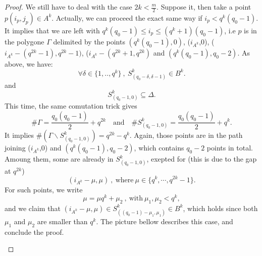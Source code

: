 \documentclass[a4paper]{article}
\begin{document}
\begin{proof}
We still have to deal with the case $2k < \frac{m}{2}$. Suppose it, then take a point $p(i_p,j_p) \in A^k$. Actually, we can proceed the exact same way if $i_p < q^k(q_0-1)$. It implies that we are left with $q^k(q_0-1) \leq i_p \leq (q^k+1)(q_0-1)$, i.e $p$ is in the polygone $\Gamma$ delimited by the points $(q^k(q_0-1),0)$, ($i_{A^k}$,0), ($i_{A^k}-(q^{2k}-1),q^{2k}-1)$, ($i_{A^k}-(q^{2k}+1,q^{2k})$ and $(q^k(q_0-1),q_0-2)$. As above, we have:
 \[ \forall \delta \in \{1,..,q^k\} \ , \ S^k_{(q_0-\delta,\delta-1)} \in B^k.\]
 and 
 \[S^k_{(q_0-1,0)} \subseteq \Delta.\]
This time, the same comutation trick gives
\[ \# \Gamma = \dfrac{q_0(q_0-1)}{2}+q^{2k} \quad \mathrm{and} \quad \# S^k_{(q_0-1,0)} = \dfrac{q_0(q_0-1)}{2}+q^{k}.\]
It implies $\# (\Gamma \backslash  S^k_{(q_0-1,0)}) = q^{2k}-q^k$. Again, those points are in the path joining ($i_{A^k}$,0) and  $(q^k(q_0-1),q_0-2)$, which contains $q_0-2$ points in total. Amoung them, some are already in $S^k_{(q_0-1,0)}$, exepted for (this is due to the gap at $q^{2k}$) 
\[ (i_{A^k}-\mu,\mu) \ , \ \mathrm{where} \ \mu \in \{q^k,\cdots,q^{2k}-1\}.\]
For such points, we write
\[\mu = \mu q^k + \mu_2 \ , \ \mathrm{with} \ \mu_1,\mu_2 < q^k,\]
and we claim that $(i_{A^k}-\mu,\mu) \in S^k_{((q_0-1)-\mu_1,\mu_1)} \in B^k$, which holds since both $\mu_1$ and $\mu_2$ are smaller than $q^k$. The picture bellow describes this case, and conclude the proof.

\begin{figure}[h]
\begin{center}
\end{center}
\end{figure}
\end{proof}
\end{document}
